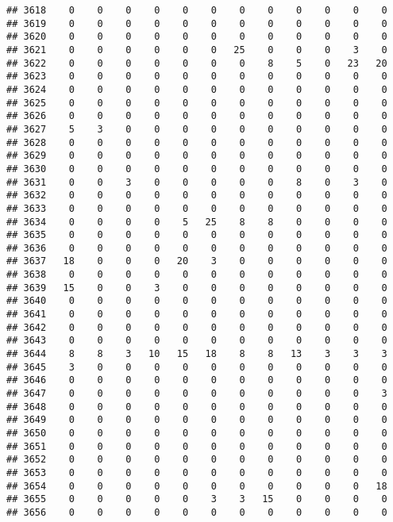 \documentclass[]{article}
\begin{document}
\begin{verbatim}
## 3618    0    0    0    0    0    0    0    0    0    0    0    0
## 3619    0    0    0    0    0    0    0    0    0    0    0    0
## 3620    0    0    0    0    0    0    0    0    0    0    0    0
## 3621    0    0    0    0    0    0   25    0    0    0    3    0
## 3622    0    0    0    0    0    0    0    8    5    0   23   20
## 3623    0    0    0    0    0    0    0    0    0    0    0    0
## 3624    0    0    0    0    0    0    0    0    0    0    0    0
## 3625    0    0    0    0    0    0    0    0    0    0    0    0
## 3626    0    0    0    0    0    0    0    0    0    0    0    0
## 3627    5    3    0    0    0    0    0    0    0    0    0    0
## 3628    0    0    0    0    0    0    0    0    0    0    0    0
## 3629    0    0    0    0    0    0    0    0    0    0    0    0
## 3630    0    0    0    0    0    0    0    0    0    0    0    0
## 3631    0    0    3    0    0    0    0    0    8    0    3    0
## 3632    0    0    0    0    0    0    0    0    0    0    0    0
## 3633    0    0    0    0    0    0    0    0    0    0    0    0
## 3634    0    0    0    0    5   25    8    8    0    0    0    0
## 3635    0    0    0    0    0    0    0    0    0    0    0    0
## 3636    0    0    0    0    0    0    0    0    0    0    0    0
## 3637   18    0    0    0   20    3    0    0    0    0    0    0
## 3638    0    0    0    0    0    0    0    0    0    0    0    0
## 3639   15    0    0    3    0    0    0    0    0    0    0    0
## 3640    0    0    0    0    0    0    0    0    0    0    0    0
## 3641    0    0    0    0    0    0    0    0    0    0    0    0
## 3642    0    0    0    0    0    0    0    0    0    0    0    0
## 3643    0    0    0    0    0    0    0    0    0    0    0    0
## 3644    8    8    3   10   15   18    8    8   13    3    3    3
## 3645    3    0    0    0    0    0    0    0    0    0    0    0
## 3646    0    0    0    0    0    0    0    0    0    0    0    0
## 3647    0    0    0    0    0    0    0    0    0    0    0    3
## 3648    0    0    0    0    0    0    0    0    0    0    0    0
## 3649    0    0    0    0    0    0    0    0    0    0    0    0
## 3650    0    0    0    0    0    0    0    0    0    0    0    0
## 3651    0    0    0    0    0    0    0    0    0    0    0    0
## 3652    0    0    0    0    0    0    0    0    0    0    0    0
## 3653    0    0    0    0    0    0    0    0    0    0    0    0
## 3654    0    0    0    0    0    0    0    0    0    0    0   18
## 3655    0    0    0    0    0    3    3   15    0    0    0    0
## 3656    0    0    0    0    0    0    0    0    0    0    0    0

\end{verbatim}
\end{document}
